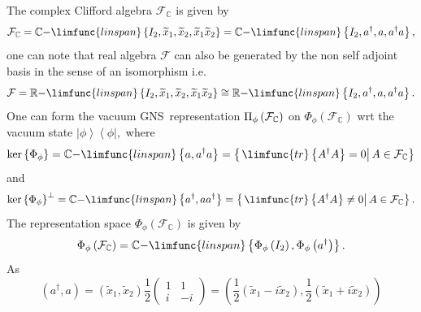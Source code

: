 \documentclass[aps,preprint]{revtex4}
\begin{document}
The complex Clifford algebra $\mathcal{F}_{\mathbb{C}}$ is given by 
\begin{equation}
\mathcal{F}_{\mathbb{C}}=\mathbb{C-}\limfunc{linspan}\left\{ I_{2},%
\widetilde{x}_{1},\widetilde{x}_{2},\widetilde{x}_{1}\widetilde{x}%
_{2}\right\} =\mathbb{C-}\limfunc{linspan}\left\{ I_{2},a^{\dagger
},a,a^{\dagger }a\right\} ,
\end{equation}%
one can note that real algebra $\mathcal{F}$ can also be generated by the
non self adjoint basis in the sense of an isomorphism i.e. 
\begin{equation}
\mathcal{F}=\mathbb{R-}\limfunc{linspan}\left\{ I_{2},\widetilde{x}_{1},%
\widetilde{x}_{2},\widetilde{x}_{1}\widetilde{x}_{2}\right\} \cong \mathbb{R-%
}\limfunc{linspan}\left\{ I_{2},a^{\dagger },a,a^{\dagger }a\right\} .
\end{equation}%
One can form the vacuum GNS\ representation $\Pi _{\phi }\left( \mathcal{F}_{%
\mathbb{C}}\right) $ on $\Phi _{\phi }\left( \mathcal{F}_{\mathbb{C}}\right) 
$ wrt the vacuum state $\left\vert \phi \right\rangle \left\langle \phi
\right\vert ,$ where 
\begin{equation}
\ker \left\{ \Phi _{\phi }\right\} =\mathbb{C-}\limfunc{linspan}\left\{
a,a^{\dagger }a\right\} =\left\{ \left. \limfunc{tr}\left\{ A^{\dagger
}A\right\} =0\right\vert A\in \mathcal{F}_{\mathbb{C}}\right\}
\end{equation}%
and 
\begin{equation}
\ker \left\{ \Phi _{\phi }\right\} ^{\bot }=\mathbb{C-}\limfunc{linspan}%
\left\{ a^{\dagger },aa^{\dagger }\right\} =\left\{ \left. \limfunc{tr}%
\left\{ A^{\dagger }A\right\} \neq 0\right\vert A\in \mathcal{F}_{\mathbb{C}%
}\right\} .
\end{equation}%
The representation space $\Phi _{\phi }\left( \mathcal{F}_{\mathbb{C}%
}\right) $ is given by 
\begin{equation}
\Phi _{\phi }\left( \mathcal{F}_{\mathbb{C}}\right) =\mathbb{C-}\limfunc{%
linspan}\left\{ \Phi _{\phi }\left( I_{2}\right) ,\Phi _{\phi }\left(
a^{\dagger }\right) \right\} .
\end{equation}%
As%
\begin{equation}
\left( a^{\dagger },a\right) =\left( \widetilde{x}_{1},\widetilde{x}%
_{2}\right) \frac{1}{2}\left( 
\begin{array}{cc}
1 & 1 \\ 
i & -i%
\end{array}%
\right) =\left( \frac{1}{2}\left( \widetilde{x}_{1}-i\widetilde{x}%
_{2}\right) ,\frac{1}{2}\left( \widetilde{x}_{1}+i\widetilde{x}_{2}\right)
\right)
\end{equation}%
\end{document}
